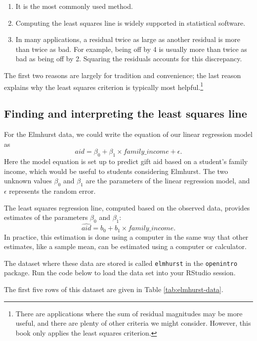 \documentclass[
  10pt,
  openany]{book}
\providecommand{\tightlist}{%
  \setlength{\itemsep}{0pt}\setlength{\parskip}{0pt}}
\theoremstyle{definition}
\theoremstyle{definition}
\theoremstyle{definition}
\theoremstyle{definition}
\theoremstyle{remark}
\begin{document}
\begin{enumerate}
\def\labelenumi{\arabic{enumi}.}
\tightlist
\item
  It is the most commonly used method.
\item
  Computing the least squares line is widely supported in statistical software.
\item
  In many applications, a residual twice as large as another residual is more than twice as bad. For example, being off by 4 is usually more than twice as bad as being off by 2. Squaring the residuals accounts for this discrepancy.
\end{enumerate}

The first two reasons are largely for tradition and convenience; the last reason explains why the least squares criterion is typically most helpful.\footnote{There are applications where the sum of residual magnitudes may be more useful, and there are plenty of other criteria we might consider. However, this book only applies the least squares criterion.}

\subsection{Finding and interpreting the least squares line}\label{finding-and-interpreting-the-least-squares-line}

For the Elmhurst data, we could write the equation of our linear regression model as
\[aid = \beta_0 + \beta_{1}\times \textit{family_income} + \epsilon.\]
Here the model equation is set up to predict gift aid based on a student's family income, which would be useful to students considering Elmhurst.
The two unknown values \(\beta_0\) and \(\beta_1\) are the parameters of the linear regression model, and \(\epsilon\) represents the random error.

The least squares regression line, computed based on the observed data, provides estimates of the parameters \(\beta_0\) and \(\beta_1\):
\[\widehat{aid} = b_0 + b_{1}\times \textit{family_income}.\]
In practice, this estimation is done using a computer in the same way that other estimates, like a sample mean, can be estimated using a computer or calculator.

The dataset where these data are stored is called \texttt{elmhurst} in the \texttt{openintro} package. Run the code below to load the data set into your RStudio session.

The first five rows of this dataset are given in Table \ref{tab:elmhurst-data}.
\end{document}
